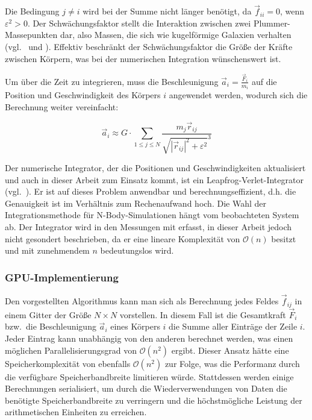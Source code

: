 Die Bedingung $j \neq i$ wird bei der Summe nicht länger benötigt, da
$\vec{f}_{ii} = 0$, wenn $\varepsilon^2 > 0$. Der Schwächungsfaktor stellt die
Interaktion zwischen zwei Plummer-Massepunkten dar, also Massen, die sich wie
kugelförmige Galaxien verhalten (vgl.~\cite{aarseth2003} und \cite{dyer1993}).
Effektiv beschränkt der Schwächungsfaktor die Größe der Kräfte zwischen Körpern,
was bei der numerischen Integration wünschenswert ist.

Um über die Zeit zu integrieren, muss die Beschleunigung
$\vec{a}_i = \frac{\vec{F}_i}{m_i}$ auf die Position und Geschwindigkeit des
Körpers $i$ angewendet werden, wodurch sich die Berechnung weiter vereinfacht:

\[
    \vec{a}_i \approx G \cdot \sum\limits_{1 \leq j \leq N}
                      \frac{m_j \vec{r}_{ij}}
                           {\sqrt{|\vec{r}_{ij}|^2 + \varepsilon^2}^3}
\]

Der numerische Integrator, der die Positionen und Geschwindigkeiten
aktualisiert und auch in dieser Arbeit zum Einsatz kommt, ist ein
Leapfrog-Verlet-Integrator (vgl.~\cite{verlet1967}). Er ist auf dieses Problem
anwendbar und berechnungseffizient, d.h. die Genauigkeit ist im Verhältnis zum
Rechenaufwand hoch. Die Wahl der Integrationsmethode für N-Body-Simulationen
hängt vom beobachteten System ab. Der Integrator wird in den Messungen mit
erfasst, in dieser Arbeit jedoch nicht gesondert beschrieben, da er eine lineare
Komplexität von $\mathcal{O}(n)$ besitzt und mit zunehmendem $n$ bedeutungslos
wird.

\subsubsection{GPU-Implementierung}
\label{methoden:nbody:gpu}

Den vorgestellten Algorithmus kann man sich als Berechnung jedes Feldes
$\vec{f}_{ij}$ in einem Gitter der Größe $N \times N$ vorstellen. In diesem Fall
ist die Gesamtkraft $\vec{F}_i$ bzw.\ die Beschleunigung $\vec{a}_i$ eines
Körpers $i$ die Summe aller Einträge der Zeile $i$. Jeder Eintrag kann
unabhängig von den anderen berechnet werden, was einen möglichen
Parallelisierungsgrad von $\mathcal{O}(n^2)$ ergibt. Dieser Ansatz hätte eine
Speicherkomplexität von ebenfalls $\mathcal{O}(n^2)$ zur Folge, was die
Performanz durch die verfügbare Speicherbandbreite limitieren würde. Stattdessen
werden einige Berechnungen serialisiert, um durch die Wiederverwendungen von
Daten die benötigte Speicherbandbreite zu verringern und die höchstmögliche
Leistung der arithmetischen Einheiten zu erreichen.

